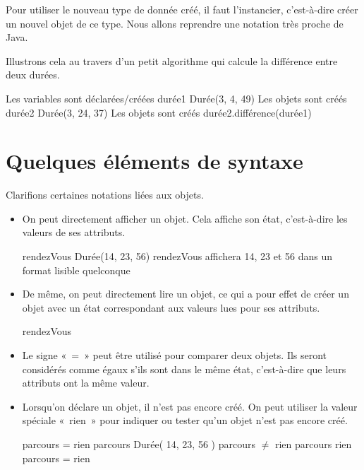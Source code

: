	Pour utiliser le nouveau type de donnée créé,
	il faut l'instancier, c'est-à-dire créer un nouvel objet de ce type.
	Nous allons reprendre une notation très proche de Java.
	
	Illustrons cela au travers d'un petit algorithme
	qui calcule la différence entre deux durées.
	
	\begin{LDA}
				\RComment Les variables sont déclarées/créées
			\Let durée1 \Gets {} Durée(3, 4, 49)	\RComment Les objets sont créés
			\Let durée2 \Gets {} Durée(3, 24, 37)	\RComment Les objets sont créés
			\Write durée2.différence(durée1)
		\EndAlgo
	\end{LDA}
	
\section{Quelques éléments de syntaxe}

	Clarifions certaines notations liées aux objets.

	\begin{itemize}
		\item
			On peut directement afficher un objet. 
			Cela affiche son état, c'est-à-dire les valeurs de ses attributs.

			\begin{LDA}
				\Decl{rendezVous}{Durée}
				\Let rendezVous \Gets {} Durée(14, 23, 56)
				\Write rendezVous 
				\RComment affichera 14, 23 et 56 dans un format lisible quelconque
			\end{LDA}
		\item
			De même, on peut directement lire un objet,
			ce qui a pour effet de créer un objet avec un état
			correspondant aux valeurs lues pour ses attributs.

			\begin{LDA}
				\Read rendezVous
			\end{LDA}
		\item 
			Le signe «~=~» peut être utilisé pour comparer deux objets.
			Ils seront considérés comme égaux s'ils sont dans le même état, 
			c'est-à-dire que leurs attributs ont la même valeur.
		\item
			Lorsqu'on déclare un objet, il n'est pas encore créé.
			On peut utiliser la valeur spéciale «~rien~»
			pour indiquer ou tester qu'un objet n'est pas encore créé.
			
			\begin{LDA}
												\RComment parcours = rien
				\Let parcours \Gets {} Durée( 14, 23, 56 )	\RComment parcours ${\neq}$ rien
				\If{parcours $\neq$ rien}
					\Let parcours \Gets rien						\RComment parcours = rien
				\EndIf
			\end{LDA}
	\end{itemize}
			

